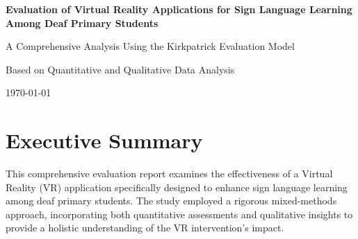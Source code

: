 \documentclass[12pt,a4paper]{article}
\begin{document}
\begin{titlepage}
\centering
\vspace*{2cm}

{\Huge\bfseries Evaluation of Virtual Reality Applications for Sign Language Learning Among Deaf Primary Students}

\vspace{1.5cm}

{\Large A Comprehensive Analysis Using the Kirkpatrick Evaluation Model}

\vspace{2cm}

{\large Based on Quantitative and Qualitative Data Analysis}

\vspace{3cm}

{\large \today}

\vspace{2cm}

\begin{abstract}
This report presents a comprehensive evaluation of a Virtual Reality (VR) application designed to enhance sign language learning among deaf primary students. Using the Kirkpatrick evaluation model, we analyzed data from 100 deaf primary students through pre-test and post-test assessments, VR reaction measures, and qualitative interviews with both students and educators. The evaluation demonstrates exceptional effectiveness across both Level 1 (Reaction) and Level 2 (Learning) outcomes, with 100\% of success targets achieved. Key findings include 84\% positive experience rate, 99\% high engagement, and significant learning gains with large effect sizes (Cohen's d > 1.6) across all assessment domains. The results strongly support continued implementation and expansion of VR-based sign language education programs.
\end{abstract}

\end{titlepage}

\tableofcontents
\newpage

\section{Executive Summary}

This comprehensive evaluation report examines the effectiveness of a Virtual Reality (VR) application specifically designed to enhance sign language learning among deaf primary students. The study employed a rigorous mixed-methods approach, incorporating both quantitative assessments and qualitative insights to provide a holistic understanding of the VR intervention's impact.
\end{document}
